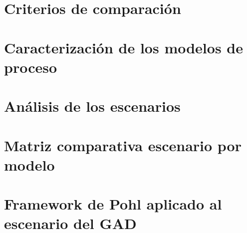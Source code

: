 \documentclass[conference,onecolumn]{IEEEtran}
\begin{document}
\section{Criterios de comparación}


\section{Caracterización de los modelos de proceso}




\section{Análisis de los escenarios}





\section{Matriz comparativa escenario por modelo}


\section{Framework de Pohl aplicado al escenario del GAD}


\printbibliography[title={Referencias}]
\end{document}
